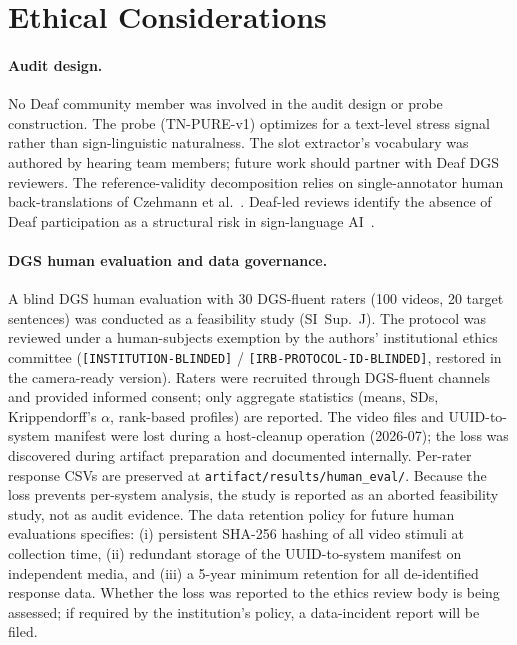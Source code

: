 \documentclass[pdflatex,sn-chicago]{sn-jnl}
\begin{document}
\section{Ethical Considerations}
\label{sec:ethics}
\paragraph{Audit design.}
No Deaf community member was involved in the audit design or probe construction. The probe (TN-PURE-v1) optimizes for a text-level stress signal rather than sign-linguistic naturalness. The slot extractor's vocabulary was authored by hearing team members; future work should partner with Deaf DGS reviewers. The reference-validity decomposition relies on single-annotator human back-translations of Czehmann et al.~\cite{czehmann2026sacred}. Deaf-led reviews identify the absence of Deaf participation as a structural risk in sign-language AI~\cite{slai_biases}.

\paragraph{DGS human evaluation and data governance.}
A blind DGS human evaluation with 30 DGS-fluent raters (100 videos, 20 target sentences) was conducted as a feasibility study (SI~Sup.~J). The protocol was reviewed under a human-subjects exemption by the authors' institutional ethics committee (\texttt{[INSTITUTION-BLINDED]} / \texttt{[IRB-PROTOCOL-ID-BLINDED]}, restored in the camera-ready version). Raters were recruited through DGS-fluent channels and provided informed consent; only aggregate statistics (means, SDs, Krippendorff's $\alpha$, rank-based profiles) are reported. The video files and UUID-to-system manifest were lost during a host-cleanup operation (2026-07); the loss was discovered during artifact preparation and documented internally. Per-rater response CSVs are preserved at \texttt{artifact/results/human\_eval/}. Because the loss prevents per-system analysis, the study is reported as an aborted feasibility study, not as audit evidence. The data retention policy for future human evaluations specifies: (i) persistent SHA-256 hashing of all video stimuli at collection time, (ii) redundant storage of the UUID-to-system manifest on independent media, and (iii) a 5-year minimum retention for all de-identified response data. Whether the loss was reported to the ethics review body is being assessed; if required by the institution's policy, a data-incident report will be filed.
\end{document}
